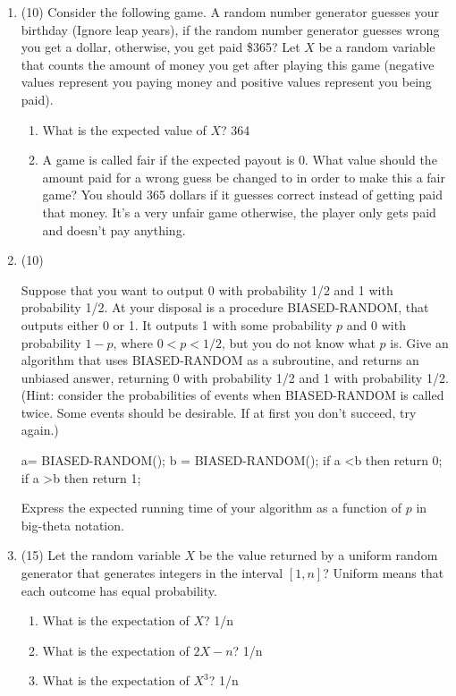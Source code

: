 \documentclass[12pt]{article}
\begin{document}
\begin{enumerate}
\item (10) Consider the following game. A random number 
generator guesses your birthday (Ignore leap years), if the random number generator guesses 
wrong you get a dollar, otherwise, you get paid \$365? Let $X$ be a random variable that counts 
the amount of money you get after playing this game (negative values represent you paying money 
and positive values represent you being paid).
\begin{enumerate}
\item What is the expected value of $X$? 364
\item A game is called fair if the expected payout is 0. What value should the amount paid for a 
wrong guess be changed to in order to make this a fair game? You should 365 dollars if it guesses correct instead of getting paid that money. It's a very unfair game otherwise, the player only gets paid and doesn't pay anything.
\end{enumerate}

\item (10)

Suppose that you want to output 0 with probability 1/2 and 1 with probability 1/2.
At your disposal is a procedure BIASED-RANDOM, that outputs either 0 or 1. It
outputs 1 with some probability $p$ and 0 with probability $1-p$, where $0 < p < 1/2$,
but you do not know what $p$ is. Give an algorithm that uses BIASED-RANDOM
as a subroutine, and returns an unbiased answer, returning 0 with probability 1/2
and 1 with probability 1/2. (Hint: consider the probabilities of events when BIASED-RANDOM is
called twice. Some events should be desirable. If at first you don't succeed, try again.)

\begin{algorithm}[H]
\begin{algorithmic}
\State a= BIASED-RANDOM();
\State b = BIASED-RANDOM();
\State if a \textless  b then return 0;
\State if a \textgreater  b then return 1;
\EndProcedure
\end{algorithmic}
\end{algorithm}

Express the expected running time of your algorithm as a function of $p$ in big-theta notation.

\item (15) Let the random variable $X$ be the value returned by a uniform random generator that generates integers in the interval $[1,n]$? Uniform means that each outcome has equal probability.
\begin{enumerate}
\item What is the expectation of $X$? 1/n
\item What is the expectation of $2X - n$? 1/n
\item What is the expectation of $X^3$? 1/n
\end{enumerate}
\end{enumerate}
\end{document}
